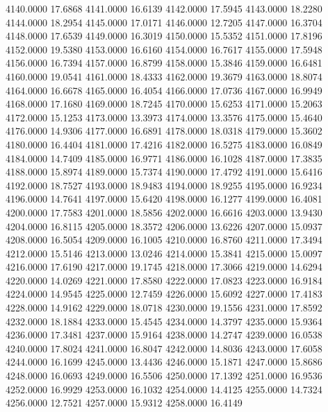 4140.0000     17.6868
4141.0000     16.6139
4142.0000     17.5945
4143.0000     18.2280
4144.0000     18.2954
4145.0000     17.0171
4146.0000     12.7205
4147.0000     16.3704
4148.0000     17.6539
4149.0000     16.3019
4150.0000     15.5352
4151.0000     17.8196
4152.0000     19.5380
4153.0000     16.6160
4154.0000     16.7617
4155.0000     17.5948
4156.0000     16.7394
4157.0000     16.8799
4158.0000     15.3846
4159.0000     16.6481
4160.0000     19.0541
4161.0000     18.4333
4162.0000     19.3679
4163.0000     18.8074
4164.0000     16.6678
4165.0000     16.4054
4166.0000     17.0736
4167.0000     16.9949
4168.0000     17.1680
4169.0000     18.7245
4170.0000     15.6253
4171.0000     15.2063
4172.0000     15.1253
4173.0000     13.3973
4174.0000     13.3576
4175.0000     15.4640
4176.0000     14.9306
4177.0000     16.6891
4178.0000     18.0318
4179.0000     15.3602
4180.0000     16.4404
4181.0000     17.4216
4182.0000     16.5275
4183.0000     16.0849
4184.0000     14.7409
4185.0000     16.9771
4186.0000     16.1028
4187.0000     17.3835
4188.0000     15.8974
4189.0000     15.7374
4190.0000     17.4792
4191.0000     15.6416
4192.0000     18.7527
4193.0000     18.9483
4194.0000     18.9255
4195.0000     16.9234
4196.0000     14.7641
4197.0000     15.6420
4198.0000     16.1277
4199.0000     16.4081
4200.0000     17.7583
4201.0000     18.5856
4202.0000     16.6616
4203.0000     13.9430
4204.0000     16.8115
4205.0000     18.3572
4206.0000     13.6226
4207.0000     15.0937
4208.0000     16.5054
4209.0000     16.1005
4210.0000     16.8760
4211.0000     17.3494
4212.0000     15.5146
4213.0000     13.0246
4214.0000     15.3841
4215.0000     15.0097
4216.0000     17.6190
4217.0000     19.1745
4218.0000     17.3066
4219.0000     14.6294
4220.0000     14.0269
4221.0000     17.8580
4222.0000     17.0823
4223.0000     16.9184
4224.0000     14.9545
4225.0000     12.7459
4226.0000     15.6092
4227.0000     17.4183
4228.0000     14.9162
4229.0000     18.0718
4230.0000     19.1556
4231.0000     17.8592
4232.0000     18.1884
4233.0000     15.4545
4234.0000     14.3797
4235.0000     15.9364
4236.0000     17.3481
4237.0000     15.9164
4238.0000     14.2747
4239.0000     16.0538
4240.0000     17.8024
4241.0000     16.8047
4242.0000     14.8036
4243.0000     17.6058
4244.0000     16.1699
4245.0000     13.4436
4246.0000     15.1871
4247.0000     15.8686
4248.0000     16.0693
4249.0000     16.5506
4250.0000     17.1392
4251.0000     16.9536
4252.0000     16.9929
4253.0000     16.1032
4254.0000     14.4125
4255.0000     14.7324
4256.0000     12.7521
4257.0000     15.9312
4258.0000     16.4149
